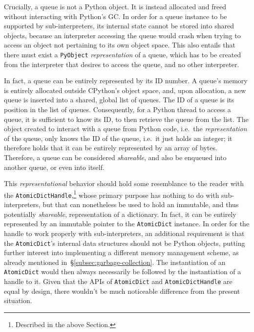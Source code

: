 Crucially, a queue is not a Python object.
It is instead allocated and freed without interacting with Python's GC\@.
In order for a queue instance to be supported by sub-interpreters, its internal state cannot be stored into shared objects, because an interpreter accessing the queue would crash when trying to access an object not pertaining to its own object space.
This also entails that there must exist a \texttt{PyObject} \emph{representation} of a queue, which has to be created from the interpreter that desires to access the queue, and no other interpreter.

In fact, a queue can be entirely represented by its ID number.
A queue's memory is entirely allocated outside CPython's object space, and, upon allocation, a new queue is inserted into a shared, global list of queues.
The ID of a queue is its position in the list of queues.
Consequently, for a Python thread to access a queue, it is sufficient to know its ID, to then retrieve the queue from the list.
The object created to interact with a queue from Python code, i.e.\ the \emph{representation} of the queue, only knows the ID of the queue, i.e.\ it just holds an integer; it therefore holds that it can be entirely represented by an array of bytes.
Therefore, a queue can be considered \emph{shareable}, and also be enqueued into another queue, or even into itself.

This \emph{representational} behavior should hold some resemblance to the reader with the \texttt{AtomicDictHandle},\footnote{%
    Described in the above Section.
} whose primary purpose has nothing to do with sub-interpreters, but that can nonetheless be used to hold an immutable, and thus potentially \emph{shareable}, representation of a dictionary.
In fact, it can be entirely represented by an immutable pointer to the \texttt{AtomicDict} instance.
In order for the handle to work properly with sub-interpreters, an additional requirement is that the \texttt{AtomicDict}'s internal data structures should not be Python objects, putting further interest into implementing a different memory management scheme, as already mentioned in~\S\ref{subsec:garbage-collection}.
The instantiation of an \texttt{AtomicDict} would then always necessarily be followed by the instantiation of a handle to it.
Given that the APIs of \texttt{AtomicDict} and \texttt{AtomicDictHandle} are equal by design, there wouldn't be much noticeable difference from the present situation.

